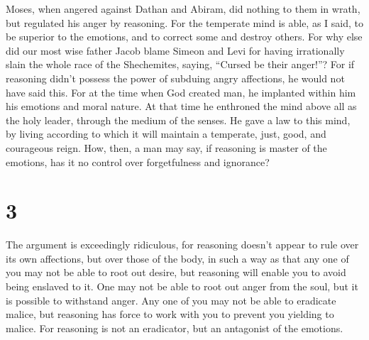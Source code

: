 Moses, when angered against Dathan and Abiram, did nothing to them in
wrath, but regulated his anger by reasoning.  For the
temperate mind is able, as I said, to be superior to the emotions, and
to correct some and destroy others.  For why else did our
most wise father Jacob blame Simeon and Levi for having irrationally
slain the whole race of the Shechemites, saying, ``Cursed be their
anger!''?  For if reasoning didn't possess the power of
subduing angry affections, he would not have said this. 
For at the time when God created man, he implanted within him his
emotions and moral nature.  At that time he enthroned the
mind above all as the holy leader, through the medium of the senses.
 He gave a law to this mind, by living according to which
it will maintain a temperate, just, good, and courageous reign.
 How, then, a man may say, if reasoning is master of the
emotions, has it no control over forgetfulness and ignorance?

\hypertarget{section-2}{%
\section{3}\label{section-2}}

 The argument is exceedingly ridiculous, for reasoning
doesn't appear to rule over its own affections, but over those of the
body,  in such a way as that any one of you may not be able
to root out desire, but reasoning will enable you to avoid being
enslaved to it.  One may not be able to root out anger from
the soul, but it is possible to withstand anger.  Any one of
you may not be able to eradicate malice, but reasoning has force to work
with you to prevent you yielding to malice.  For reasoning
is not an eradicator, but an antagonist of the emotions.

